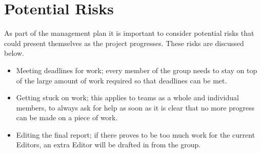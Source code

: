 \section{Potential Risks} %
\label{sec:potential_risks}
As part of the management plan it is important to consider potential risks that could present themselves as the project progresses. These risks are discussed below.
\begin{itemize}
	\item Meeting deadlines for work; every member of the group needs to stay on top of the large amount of work required so that deadlines can be met.
	\item Getting stuck on work; this applies to teams as a whole and individual members, to always ask for help as soon as it is clear that no more progress can be made on a piece of work.
	\item Editing the final report; if there proves to be too much work for the current Editors, an extra Editor will be drafted in from the group.
\end{itemize}

